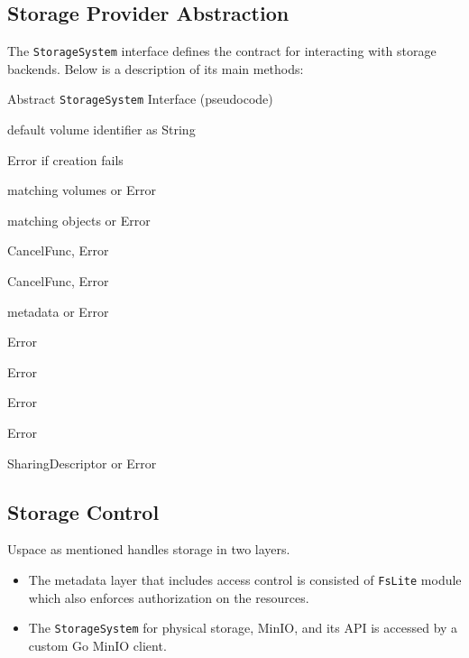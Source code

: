 \newpage

\subsection{Storage Provider Abstraction}

The \texttt{StorageSystem} interface defines the contract for interacting with storage backends. Below is a description of its main methods:

\begin{algorithm}[H]
\caption{Abstract \texttt{StorageSystem} Interface (pseudocode)}
\begin{algorithmic}[1]

  \State \Return default volume identifier as String
\EndFunction

  \State \Return Error if creation fails
\EndFunction

  \State \Return matching volumes or Error
\EndFunction

  \State \Return matching objects or Error
\EndFunction

  \State \Return CancelFunc, Error
\EndFunction

  \State \Return CancelFunc, Error
\EndFunction

  \State \Return metadata or Error
\EndFunction

  \State \Return Error
\EndFunction

  \State \Return Error
\EndFunction

  \State \Return Error
\EndFunction

  \State \Return Error
\EndFunction

  \State \Return SharingDescriptor or Error
\EndFunction

\end{algorithmic}
\end{algorithm}


\newpage
\subsection{Storage Control}
Uspace as mentioned handles storage in two layers. 
\begin{itemize}

\item  The metadata layer that includes access control is consisted of \texttt{FsLite} module which also 
enforces authorization on the resources.
\item The \texttt{StorageSystem} for physical storage, MinIO, and its API is accessed by a custom Go MinIO client.
\end{itemize}


